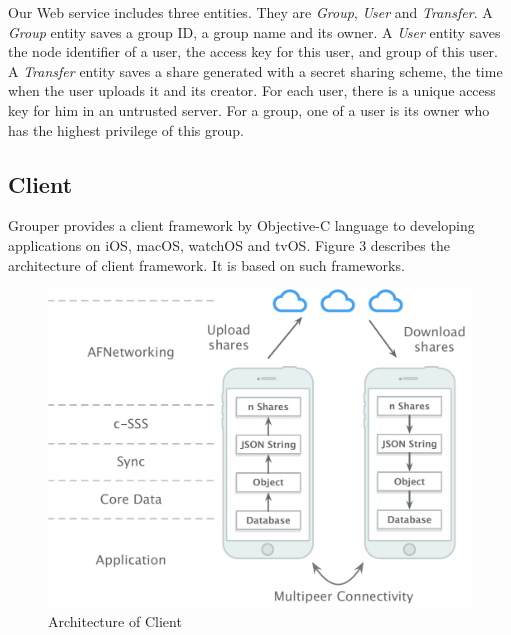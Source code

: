 \documentclass[twocolumn,10pt]{article}
\begin{document}
Our Web service includes three entities. They are \emph{Group}, \emph{User} and \emph{Transfer}. A \emph{Group} entity saves a group ID, a group name and its owner. A \emph{User} entity saves the node identifier of a user, the access key for this user, and group of this user. A \emph{Transfer} entity saves a share generated with a secret sharing scheme, the time when the user uploads it and its creator. For each user, there is a unique access key for him in an untrusted server. For a group, one of a user is its owner who has the highest privilege of this group.

\subsection{Client}

Grouper provides a client framework by Objective-C language to developing applications on iOS, macOS, watchOS and tvOS. Figure 3 describes the architecture of client framework. It is based on such frameworks.   

\begin{figure}[!htb]
	\centering
	\includegraphics[scale=0.35]{architecture}
	\caption{Architecture of Client}
\end{figure}
\end{document}
